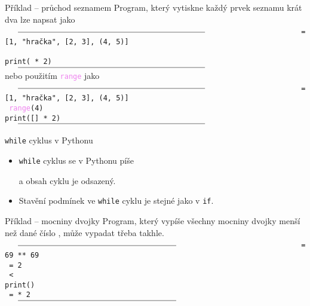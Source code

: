 \begin{frame}{Příklad -- průchod seznamem}
 Program, který vytiskne každý prvek seznamu krát dva lze napsat jako
 $\vcenter{\rule{.65\textwidth}{0.4pt}}$
 \texttt{ = [1, "hračka", [2, 3], (4, 5)]}\\
 \texttt{   \mlb{:}}\\
 \hspace{4ex}\texttt{print( * 2)}\\
 $\vcenter{\rule{.65\textwidth}{0.4pt}}$
 \pause
 nebo použitím \texttt{\textcolor{violet}{range}} jako
 $\vcenter{\rule{.65\textwidth}{0.4pt}}$
 \texttt{ = [1, "hračka", [2, 3], (4, 5)]}\\
 \texttt{   \textcolor{violet}{range}(4)\mlb{:}}\\
 \hspace{4ex}\texttt{print([] * 2)}
 $\vcenter{\rule{.65\textwidth}{0.4pt}}$
\end{frame}

\begin{frame}{\texttt{while} cyklus v Pythonu}
 \begin{itemize}
  \item<1-> \texttt{while} cyklus se v Pythonu píše
   \begin{center}
   \end{center}
   a obsah cyklu je odsazený.
  \item<2-> Stavění podmínek ve \texttt{\alert{while}} cyklu je stejné jako v
   \texttt{\alert{if}}.
 \end{itemize}
\end{frame}

\begin{frame}{Příklad -- mocniny dvojky}
 Program, který vypíše všechny mocniny dvojky menší než dané číslo
 \texttt{}, může vypadat třeba takhle.
 $\vcenter{\rule{.55\textwidth}{0.4pt}}$
 \texttt{ = 69 ** 69}\\
 \texttt{ = 2}\\
 \texttt{  < \mlb{:}}\\
 \hspace{4ex}\texttt{print()}\\
 \hspace{4ex}\texttt{ =  * 2}
 $\vcenter{\rule{.55\textwidth}{0.4pt}}$
\end{frame}

